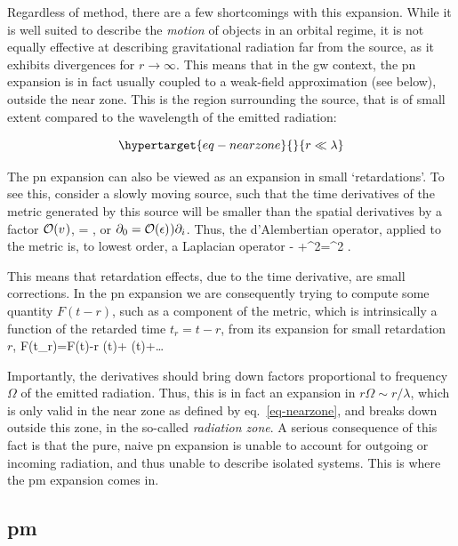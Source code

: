 \documentclass[
  11pt,
  a4paper,
  DIV=11,
  numbers=noendperiod,
  oneside]{scrreprt}
\let\[\relax \let\]\relax %
\DeclareRobustCommand{\[}{\begin{equation}}
\DeclareRobustCommand{\]}{\end{equation}}
\begin{document}
Regardless of method, there are a few shortcomings with this expansion.
While it is well suited to describe the \emph{motion} of objects in an
orbital regime, it is not equally effective at describing gravitational
radiation far from the source, as it exhibits divergences for
\(r\to\infty\). This means that in the \gls{gw} context, the \gls{pn}
expansion is in fact usually coupled to a weak-field approximation (see
below), outside the near zone. This is the region surrounding the
source, that is of small extent compared to the wavelength of the
emitted radiation:

\begin{equation}\protect\hypertarget{eq-nearzone}{}{
r \ll \lambda
}\label{eq-nearzone}\end{equation}

The \gls{pn} expansion can also be viewed as an expansion in small
`retardations'. To see this, consider a slowly moving source, such that
the time derivatives of the metric generated by this source will be
smaller than the spatial derivatives by a factor \(\mathcal{O}(v^{})\), \[
= ,
\] or \(\partial_0=\mathcal{O}(\epsilon)^{}) \partial_i\). Thus, the
d'Alembertian operator, applied to the metric is, to lowest order, a
Laplacian operator \[
- +\nabla^2= \nabla^2 .
\]

This means that retardation effects, due to the time derivative, are
small corrections. In the \gls{pn} expansion we are consequently trying
to compute some quantity \(F(t-r)\), such as a component of the metric,
which is intrinsically a function of the retarded time \(t_r=t-r\), from
its expansion for small retardation \(r\), \[
F(t_r)=F(t)-{r} (t)+ (t)+\ldots
\]

Importantly, the derivatives should bring down factors proportional to
frequency \(\Omega\) of the emitted radiation. Thus, this is in fact an
expansion in \(r \Omega\sim r / \lambda\), which is only valid in the
near zone as defined by eq.~\ref{eq-nearzone}, and breaks down outside
this zone, in the so-called \emph{radiation zone}. A serious consequence
of this fact is that the pure, naive \gls{pn} expansion is unable to
account for outgoing or incoming radiation, and thus unable to describe
isolated systems. This is where the \gls{pm} expansion comes in.

\hypertarget{pm}{%
\subsection{\texorpdfstring{\acrlong{pm}}{}}\label{pm}}
\end{document}
